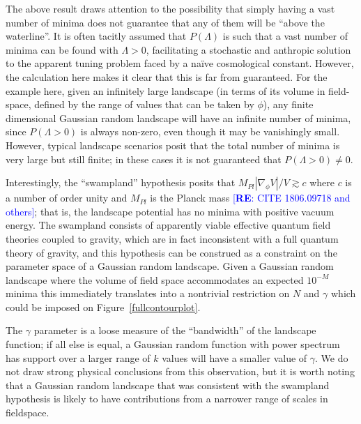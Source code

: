 \documentclass[12pt]{article}
\newcommand{\re}[1]{\textcolor{blue}{[{\bf RE}: #1]}}
\begin{document}
The above result draws attention to the possibility that simply having a vast number of minima does not guarantee that any of them will be ``above the waterline''.  It is often tacitly assumed that $P(\Lambda)$ is such that a vast number of minima can be found with $\Lambda>0$, facilitating a stochastic and anthropic solution to the apparent tuning problem faced by a na\"ive cosmological constant. However, the calculation here makes it clear that this is far from guaranteed.  For the example here, given an infinitely large landscape (in terms of its volume in field-space, defined by the range of values that can be taken by $\phi$), any finite dimensional Gaussian random landscape will have an infinite number of minima, since $P(\Lambda >0)$ is always non-zero, even though it may be vanishingly small. However, typical landscape scenarios posit that the total number of minima is very large but still finite; in these cases it is not guaranteed that $P(\Lambda >0) \ne 0$.  

Interestingly, the ``swampland'' hypothesis posits that $M_{Pl} |\nabla_\phi V|/ V \gtrsim c$ where $c$ is a number of order unity and $M_{Pl}$ is the Planck mass \re{CITE  1806.09718 and others}; that is, the landscape potential has no minima with  positive vacuum energy. The swampland consists of apparently viable effective quantum field theories coupled to gravity, which are in fact inconsistent with a full quantum theory of gravity,  and this hypothesis can be construed as a constraint on the parameter space of a Gaussian random landscape. Given a Gaussian random landscape where the volume of field space accommodates an expected $10^{-M}$ minima this immediately translates into a nontrivial restriction on $N$ and $\gamma$ which could be imposed on  Figure~\ref{fullcontourplot}. 

The $\gamma$  parameter is a loose measure of the ``bandwidth'' of the landscape function; if all else is equal, a Gaussian random function with power spectrum has support over a larger range of $k$ values will have a smaller value of $\gamma$. We do not draw strong physical conclusions from this observation, but it is worth noting that a Gaussian random landscape that was consistent with the swampland hypothesis is likely to have contributions from a narrower range of scales in fieldspace. 
\end{document}
